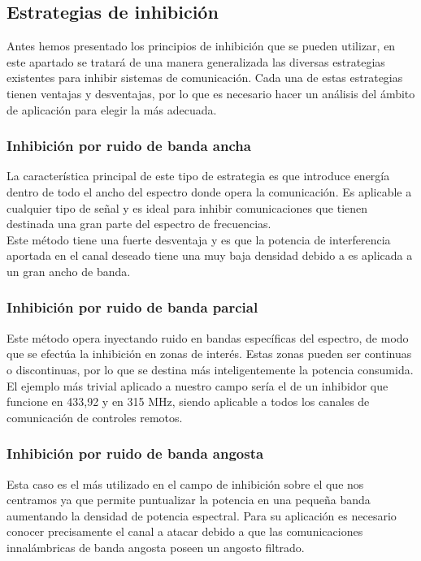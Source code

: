 \documentclass[12pt]{report}
\begin{document}
\subsection{Estrategias de inhibición}

Antes hemos presentado los principios de inhibición que se pueden utilizar, en este apartado se tratará de una manera generalizada las diversas 
estrategias existentes para inhibir sistemas de comunicación. Cada una de estas estrategias tienen ventajas y desventajas, por lo que es necesario
hacer un análisis del ámbito de aplicación para elegir la más adecuada.


\subsubsection{Inhibición por ruido de banda ancha}

La característica principal de este tipo de estrategia es que introduce energía dentro de todo el ancho del espectro donde opera la comunicación.
Es aplicable a cualquier tipo de señal y es ideal para inhibir comunicaciones que tienen destinada una gran parte del espectro de frecuencias.\\
Este método tiene una fuerte desventaja y es que la potencia de interferencia aportada en el canal deseado tiene una muy baja densidad debido 
a es aplicada a un gran ancho de banda.

\subsubsection{Inhibición por ruido de banda parcial}

Este método opera inyectando ruido en bandas específicas del espectro, de modo que se efectúa la  inhibición en zonas de interés. Estas zonas 
pueden ser continuas o discontinuas, por lo que se destina más inteligentemente la potencia consumida. El ejemplo más trivial aplicado a nuestro
campo sería el de un inhibidor que funcione en 433,92 y en 315 MHz, siendo  aplicable a todos los canales de comunicación de controles remotos.

\subsubsection{Inhibición por ruido de banda angosta}

Esta caso es el más utilizado en el campo de inhibición sobre el que nos centramos ya que permite puntualizar la potencia en una pequeña
banda aumentando la densidad de potencia espectral. Para su aplicación es necesario conocer precisamente el canal a atacar debido a que las 
comunicaciones innalámbricas de banda angosta poseen un angosto filtrado.
\end{document}

